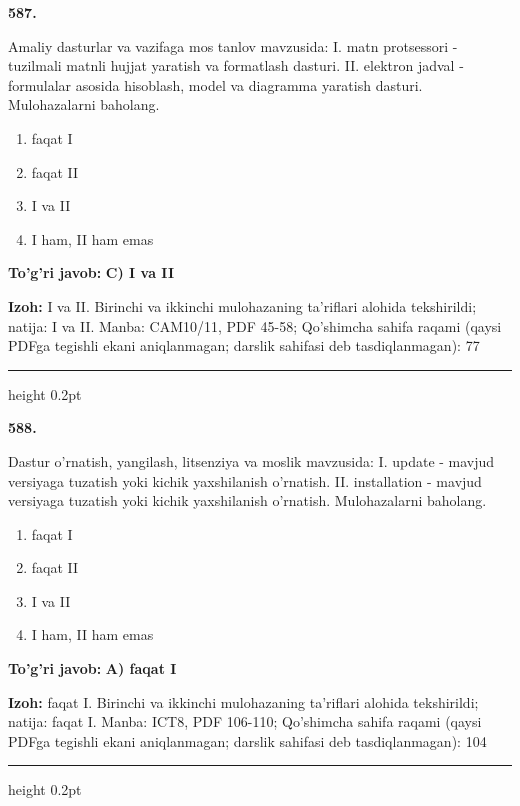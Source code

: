 \documentclass[10pt,a4paper]{article}
\begin{document}
{\bfseries\sffamily\color{ink} 587.}
\par
Amaliy dasturlar va vazifaga mos tanlov mavzusida: I. matn protsessori - tuzilmali matnli hujjat yaratish va formatlash dasturi. II. elektron jadval - formulalar asosida hisoblash, model va diagramma yaratish dasturi. Mulohazalarni baholang.
\begin{enumerate}[label=\Alph*),leftmargin=9mm]
\item faqat I
\item faqat II
\item I va II
\item I ham, II ham emas
\end{enumerate}
\begin{tcolorbox}[enhanced,breakable,colback=teal!4,colframe=teal!60!black,boxrule=0.45pt,arc=1.2mm,left=2.7mm,right=2.7mm,top=1.8mm,bottom=1.8mm,before skip=2mm,after skip=2mm]
{\bfseries\sffamily\color{teal}To'g'ri javob:} \textbf{C) I va II}
\par\smallskip
{\bfseries Izoh:} I va II. Birinchi va ikkinchi mulohazaning ta'riflari alohida tekshirildi; natija: I va II. Manba: CAM10/11, PDF 45-58; Qo'shimcha sahifa raqami (qaysi PDFga tegishli ekani aniqlanmagan; darslik sahifasi deb tasdiqlanmagan): 77
\end{tcolorbox}
\vspace{2mm}\hrule height 0.2pt\vspace{3mm}

{\bfseries\sffamily\color{ink} 588.}
\par
Dastur o'rnatish, yangilash, litsenziya va moslik mavzusida: I. update - mavjud versiyaga tuzatish yoki kichik yaxshilanish o'rnatish. II. installation - mavjud versiyaga tuzatish yoki kichik yaxshilanish o'rnatish. Mulohazalarni baholang.
\begin{enumerate}[label=\Alph*),leftmargin=9mm]
\item faqat I
\item faqat II
\item I va II
\item I ham, II ham emas
\end{enumerate}
\begin{tcolorbox}[enhanced,breakable,colback=teal!4,colframe=teal!60!black,boxrule=0.45pt,arc=1.2mm,left=2.7mm,right=2.7mm,top=1.8mm,bottom=1.8mm,before skip=2mm,after skip=2mm]
{\bfseries\sffamily\color{teal}To'g'ri javob:} \textbf{A) faqat I}
\par\smallskip
{\bfseries Izoh:} faqat I. Birinchi va ikkinchi mulohazaning ta'riflari alohida tekshirildi; natija: faqat I. Manba: ICT8, PDF 106-110; Qo'shimcha sahifa raqami (qaysi PDFga tegishli ekani aniqlanmagan; darslik sahifasi deb tasdiqlanmagan): 104
\end{tcolorbox}
\vspace{2mm}\hrule height 0.2pt\vspace{3mm}
\end{document}
